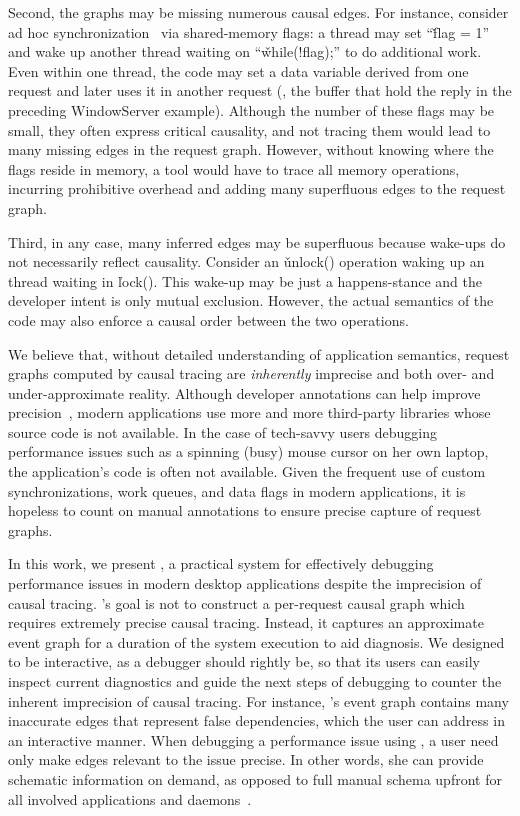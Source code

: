 Second, the graphs may be missing numerous causal edges.  For instance,
consider ad hoc synchronization~\cite{xiong2010ad} via shared-memory flags: a
thread may set ``\v{flag = 1}'' and wake up another thread waiting on
``\v{while(!flag);}'' to do additional work.  Even within one thread, the code
may set a data variable derived from one request and later uses it in another
request (\eg, the buffer that hold the reply in the preceding WindowServer
example). Although the number of these flags may be small, they often express
critical causality, and not tracing them would lead to many missing edges in
the request graph.  However, without knowing where the flags reside in memory,
a tool would have to trace all memory operations, incurring prohibitive
overhead and adding many superfluous edges to the request graph.

Third, in any case, many inferred edges may be superfluous because wake-ups do
not necessarily reflect causality.  Consider an \v{unlock()} operation waking
up an thread waiting in \v{lock()}.  This wake-up may be just a happens-stance
and the developer intent is only mutual exclusion.  However, the actual
semantics of the code may also enforce a causal order between the two
operations.

We believe that, without detailed understanding of application semantics,
request graphs computed by causal tracing are \emph{inherently} imprecise and
both over- and under-approximate reality.  Although developer annotations can
help improve precision~\cite{barham2004using, reynolds2006pip}, modern
applications use more and more third-party libraries whose source code is not
available.  In the case of tech-savvy users debugging performance issues such
as a spinning (busy) mouse cursor on her own laptop, the application's code is
often not available.  Given the frequent use of custom synchronizations, work
queues, and data flags in modern applications, it is hopeless to count on
manual annotations to ensure precise capture of request graphs.

In this work, we present \xxx, a practical system for effectively debugging
performance issues in modern desktop applications despite the imprecision of
causal tracing.  \xxx's goal is not to construct a per-request causal graph
which requires extremely precise causal tracing.  Instead, it captures an
approximate event graph for a duration of the system execution to aid
diagnosis.  We designed \xxx to be interactive, as a debugger should rightly
be, so that its users can easily inspect current diagnostics and guide the next
steps of debugging to counter the inherent imprecision of causal tracing. For
instance, \xxx's event graph contains many inaccurate edges that represent
false dependencies, which the user can address in an interactive manner.  When
debugging a performance issue using \xxx, a user need only make edges relevant
to the issue precise.  In other words, she can provide schematic information on
demand, as opposed to full manual schema upfront for all involved applications
and daemons~\cite{barham2004using}.

